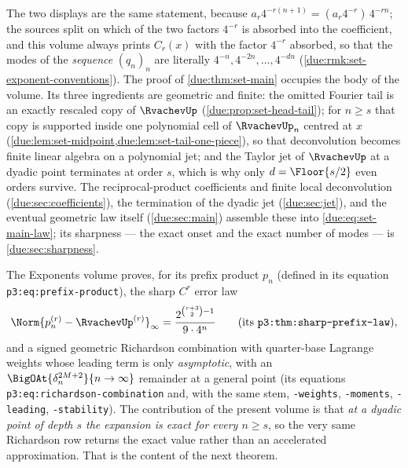 \documentclass[11pt,oneside]{article}
\theoremstyle{plain}
\theoremstyle{definition}
\theoremstyle{remark}
\newcommand{\upn}[1]{\RvachevUp_{#1}}
\newcommand{\am}[1]{a_{#1}}                                 %
\newcommand{\Cr}[2]{C_{#1}\!\left(#2\right)}                %
\newcommand{\qn}[1]{q_{#1}}                                 %
\begin{document}
The two displays are the same statement, because
$\am{r}4^{-r(n+1)}=(\am{r}4^{-r})\,4^{-rn}$; the sources split on which of
the two factors $4^{-r}$ is absorbed into the coefficient, and this volume
always prints $\Cr{r}{x}$ with the factor $4^{-r}$ absorbed, so that the
modes of the \emph{sequence} $(\qn{n})_n$ are literally
$4^{-n},4^{-2n},\ldots,4^{-dn}$
(\cref{due:rmk:set-exponent-conventions}).
The proof of \cref{due:thm:set-main} occupies the body of the volume.  Its
three ingredients are geometric and finite: the omitted Fourier tail is an
exactly rescaled copy of $\RvachevUp$ (\cref{due:prop:set-head-tail}); for
$n\ge s$ that copy is supported inside one polynomial cell of $\upn{n}$
centred at $x$ (\cref{due:lem:set-midpoint,due:lem:set-tail-one-piece}),
so that deconvolution becomes finite linear algebra on a polynomial jet;
and the Taylor jet of $\RvachevUp$ at a dyadic point terminates at order
$s$, which is why only $d=\Floor{s/2}$ even orders survive.  The reciprocal-product coefficients and finite local deconvolution
(\cref{due:sec:coefficients}), the termination of the dyadic jet
(\cref{due:sec:jet}), and the eventual geometric law itself
(\cref{due:sec:main}) assemble these into \cref{due:eq:set-main-law};
its sharpness --- the exact onset and the exact number of modes --- is
\cref{due:sec:sharpness}.

The Exponents volume \cite{proveit-exponents} proves, for its prefix
product $p_n$ (defined in its equation
\texttt{p3:eq:prefix-\allowbreak product}), the sharp $C^{r}$ error law
\[
 \Norm{p_n^{(r)}-\RvachevUp^{(r)}}_\infty=\frac{2^{\binom{r+3}{2}-1}}{9\cdot4^{n}}
 \qquad(\text{its }\texttt{p3:thm:sharp-prefix-law}),
\]
and a signed geometric Richardson combination with quarter-base Lagrange
weights whose leading term is only \emph{asymptotic}, with an
$\BigOAt{\delta_n^{2M+2}}{n\to\infty}$ remainder at a general point (its
equations \texttt{p3:eq:richardson-\allowbreak combination} and, with the same stem,
\texttt{-weights}, \texttt{-moments}, \texttt{-leading},
\texttt{-stability}).  The contribution of the present volume is that
\emph{at a dyadic point of depth $s$ the expansion is exact for every
$n\ge s$}, so the very same Richardson row returns the exact value rather
than an accelerated approximation.  That is the content of the next
theorem.
\end{document}
